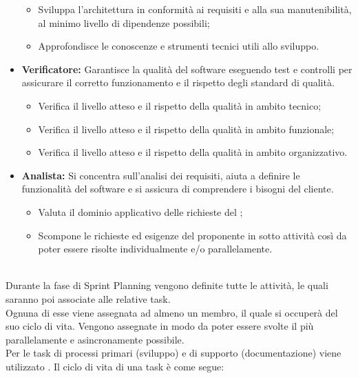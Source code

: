 \begin{itemize}
\begin{itemize}
    \item Sviluppa l'architettura in conformità ai requisiti e alla sua manutenibilità, al minimo
        livello di dipendenze possibili;
    \item Approfondisce le conoscenze e strumenti tecnici utili allo sviluppo.
  \end{itemize}
  \item \textbf{Verificatore:} Garantisce la qualità del software eseguendo test e controlli per assicurare il corretto funzionamento e il rispetto degli standard di qualità.
	\begin{itemize}
    \item Verifica il livello atteso e il rispetto della qualità in ambito tecnico;
    \item Verifica il livello atteso e il rispetto della qualità in ambito funzionale;
    \item Verifica il livello atteso e il rispetto della qualità in ambito organizzativo.
  \end{itemize}
  \item \textbf{Analista:} Si concentra sull'analisi dei requisiti, aiuta a definire le funzionalità del software e si assicura di comprendere i bisogni del cliente.
  \begin{itemize}
    \item Valuta il dominio applicativo delle richieste del ;
    \item Scompone le richieste ed esigenze del proponente in sotto attività così da poter essere
        risolte individualmente e/o parallelamente.
  \end{itemize}
\end{itemize}
 \label{sec:gestione_task}\\
Durante la fase di Sprint Planning vengono definite tutte le attività, le quali saranno poi associate alle relative task.\\
Ognuna di esse viene assegnata ad almeno un membro, il quale si occuperà del suo ciclo di vita. Vengono assegnate in modo da poter essere svolte il più parallelamente e asincronamente possibile.\\
Per le task di processi primari (sviluppo) e di supporto (documentazione) viene utilizzato .
Il ciclo di vita di una task è come segue:

